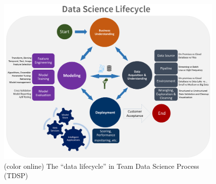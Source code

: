 \documentclass[12pt,letterpaper]{article}
\begin{document}
\pagebreak
\section*{}


\begin{figure}[h!]
  \centering
    \includegraphics[width=1.0\linewidth]{../img/TDSP_Data_Science_Lifecycle.png}
    \caption{(color online) The ``data lifecycle'' in Team Data Science Process (TDSP)}
    \label{fig:tdsp}
  \end{figure}


\clearpage
\section*{}

\center{}
\end{document}
